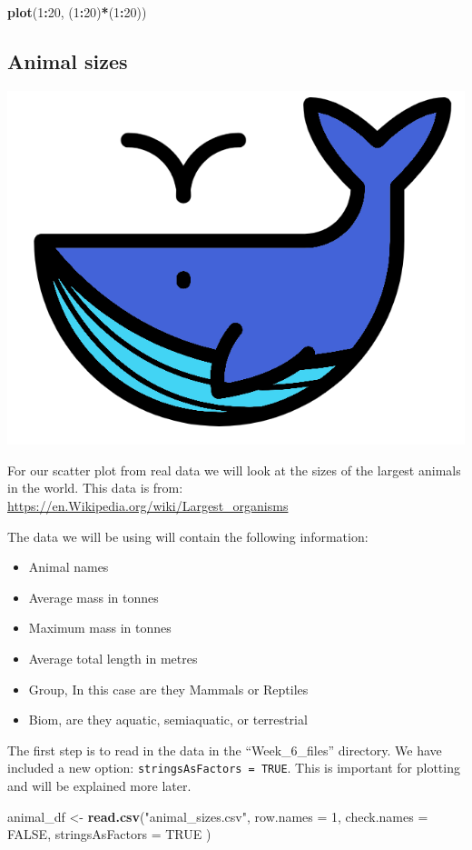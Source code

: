 \documentclass[]{book}
\newenvironment{Shaded}{\begin{snugshade}}{\end{snugshade}}
\newcommand{\KeywordTok}[1]{\textcolor[rgb]{0.13,0.29,0.53}{\textbf{#1}}}
\newcommand{\DataTypeTok}[1]{\textcolor[rgb]{0.13,0.29,0.53}{#1}}
\newcommand{\DecValTok}[1]{\textcolor[rgb]{0.00,0.00,0.81}{#1}}
\newcommand{\StringTok}[1]{\textcolor[rgb]{0.31,0.60,0.02}{#1}}
\newcommand{\OtherTok}[1]{\textcolor[rgb]{0.56,0.35,0.01}{#1}}
\newcommand{\OperatorTok}[1]{\textcolor[rgb]{0.81,0.36,0.00}{\textbf{#1}}}
\newcommand{\NormalTok}[1]{#1}
\providecommand{\tightlist}{%
  \setlength{\itemsep}{0pt}\setlength{\parskip}{0pt}}
\begin{document}
\begin{Shaded}
\begin{Highlighting}[]
\KeywordTok{plot}\NormalTok{(}\DecValTok{1}\OperatorTok{:}\DecValTok{20}\NormalTok{, (}\DecValTok{1}\OperatorTok{:}\DecValTok{20}\NormalTok{)}\OperatorTok{*}\NormalTok{(}\DecValTok{1}\OperatorTok{:}\DecValTok{20}\NormalTok{))}
\end{Highlighting}
\end{Shaded}

\subsection{Animal sizes}\label{animal-sizes}

\begin{center}\includegraphics[width=0.15\linewidth]{figures/blue_whale} \end{center}

For our scatter plot from real data we will look at the sizes of the
largest animals in the world. This data is from:
\url{https://en.Wikipedia.org/wiki/Largest_organisms}

The data we will be using will contain the following information:

\begin{itemize}
\tightlist
\item
  Animal names
\item
  Average mass in tonnes
\item
  Maximum mass in tonnes
\item
  Average total length in metres
\item
  Group, In this case are they Mammals or Reptiles
\item
  Biom, are they aquatic, semiaquatic, or terrestrial
\end{itemize}

The first step is to read in the data in the ``Week\_6\_files''
directory. We have included a new option:
\texttt{stringsAsFactors\ =\ TRUE}. This is important for plotting and
will be explained more later.

\begin{Shaded}
\begin{Highlighting}[]
\NormalTok{animal_df <-}\StringTok{ }\KeywordTok{read.csv}\NormalTok{(}\StringTok{"animal_sizes.csv"}\NormalTok{, }
                      \DataTypeTok{row.names =} \DecValTok{1}\NormalTok{, }\DataTypeTok{check.names =} \OtherTok{FALSE}\NormalTok{,}
                      \DataTypeTok{stringsAsFactors =} \OtherTok{TRUE}
\NormalTok{                      )}
\end{Highlighting}
\end{Shaded}
\end{document}
